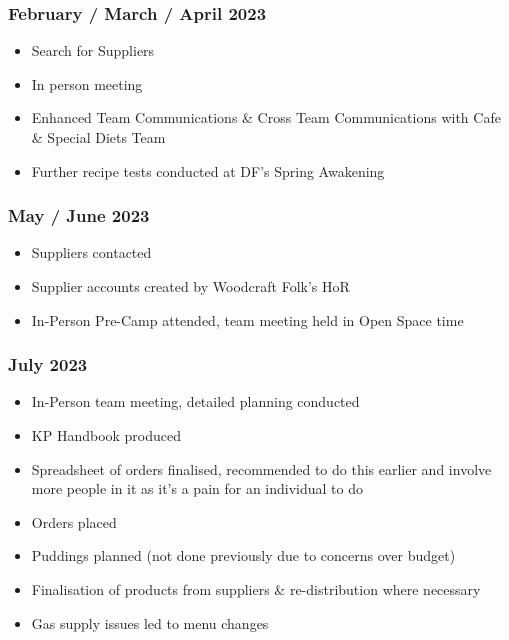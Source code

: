 \subsubsection{February / March / April 2023}
\begin{itemize}
    \item Search for Suppliers
    \item In person meeting
    \item Enhanced Team Communications \& Cross Team Communications with Cafe \& Special  Diets Team
    \item Further recipe tests conducted at DF's Spring Awakening
\end{itemize}
\subsubsection{May / June 2023}
\begin{itemize}
    \item Suppliers contacted
    \item Supplier accounts created by Woodcraft Folk's HoR
    \item In-Person Pre-Camp attended, team meeting held in Open Space time    
\end{itemize}
\subsubsection{July 2023}
\begin{itemize}
    \item In-Person team meeting, detailed planning conducted
    \item KP Handbook produced
    \item Spreadsheet of orders finalised, recommended to do this earlier and involve more people in it as it's a pain for an individual to do
    \item Orders placed
    \item Puddings planned (not done previously due to concerns over budget)
    \item Finalisation of products from suppliers \& re-distribution where necessary
    \item Gas supply issues led to menu changes
\end{itemize}

